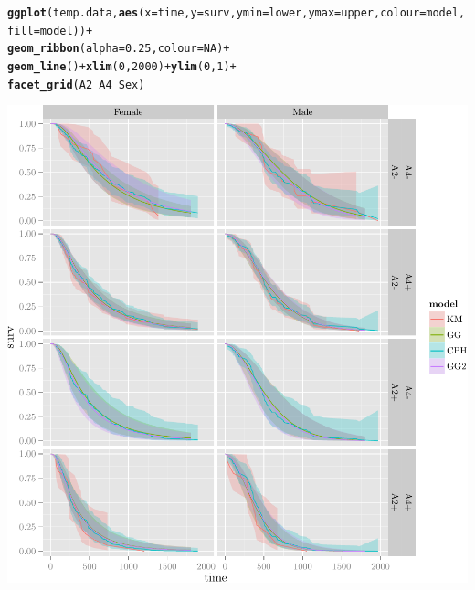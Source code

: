 \documentclass{article}\usepackage[]{graphicx}\usepackage[]{color}
\makeatletter
\def\maxwidth{ %
  \ifdim\Gin@nat@width>\linewidth
    \linewidth
  \else
    \Gin@nat@width
  \fi
}
\newcommand{\hlnum}[1]{\textcolor[rgb]{0.686,0.059,0.569}{#1}}%
\newcommand{\hlopt}[1]{\textcolor[rgb]{0,0,0}{#1}}%
\newcommand{\hlstd}[1]{\textcolor[rgb]{0.345,0.345,0.345}{#1}}%
\newcommand{\hlkwc}[1]{\textcolor[rgb]{0.333,0.667,0.333}{#1}}%
\newcommand{\hlkwd}[1]{\textcolor[rgb]{0.737,0.353,0.396}{\textbf{#1}}}%
\newenvironment{kframe}{%
 \def\at@end@of@kframe{}%
 \ifinner\ifhmode%
  \def\at@end@of@kframe{\end{minipage}}%
  \begin{minipage}{\columnwidth}%
 \fi\fi%
 \def\FrameCommand##1{\hskip\@totalleftmargin \hskip-\fboxsep
 \colorbox{shadecolor}{##1}\hskip-\fboxsep
     \hskip-\linewidth \hskip-\@totalleftmargin \hskip\columnwidth}%
 \MakeFramed {\advance\hsize-\width
   \@totalleftmargin\z@ \linewidth\hsize
   \@setminipage}}%
 {\par\unskip\endMakeFramed%
 \at@end@of@kframe}
\newenvironment{knitrout}{}{} %
\makeatother
\begin{document}
\begin{knitrout}
{}


\begin{kframe}\begin{alltt}
\hlkwd{ggplot}\hlstd{(temp.data,} \hlkwd{aes}\hlstd{(}\hlkwc{x} \hlstd{= time,} \hlkwc{y} \hlstd{= surv,} \hlkwc{ymin} \hlstd{= lower,} \hlkwc{ymax} \hlstd{= upper,} \hlkwc{colour} \hlstd{= model,} \hlkwc{fill} \hlstd{= model))} \hlopt{+}
        \hlkwd{geom_ribbon}\hlstd{(}\hlkwc{alpha} \hlstd{=} \hlnum{0.25}\hlstd{,} \hlkwc{colour} \hlstd{=} \hlnum{NA}\hlstd{)} \hlopt{+}
        \hlkwd{geom_line}\hlstd{()} \hlopt{+} \hlkwd{xlim}\hlstd{(}\hlnum{0}\hlstd{,} \hlnum{2000}\hlstd{)} \hlopt{+} \hlkwd{ylim}\hlstd{(}\hlnum{0}\hlstd{,} \hlnum{1}\hlstd{)} \hlopt{+}
        \hlkwd{facet_grid}\hlstd{(A2} \hlopt{~} \hlstd{A4} \hlopt{~} \hlstd{Sex)}
\end{alltt}


{\ttfamily\noindent\color{warningcolor}{\#\# Warning: Removed 3 rows containing missing values (geom\_path).}}

{\ttfamily\noindent\color{warningcolor}{\#\# Warning: Removed 3 rows containing missing values (geom\_path).}}

{\ttfamily\noindent\color{warningcolor}{\#\# Warning: Removed 2 rows containing missing values (geom\_path).}}

{\ttfamily\noindent\color{warningcolor}{\#\# Warning: Removed 2 rows containing missing values (geom\_path).}}\end{kframe}

{\centering \includegraphics[width=\maxwidth]{figure/05-final-fit-assessment-2-2} 

}



\end{knitrout}
\end{document}
